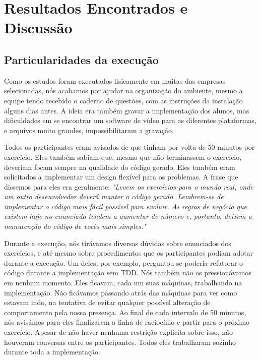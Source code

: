 \chapter{Resultados Encontrados e Discussão}
\label{cap:discussao}

\section{Particularidades da execução}

Como os estudos foram executados fisicamente em muitas das empresas selecionadas,
nós acabamos por ajudar na organização do ambiente, mesmo a equipe tendo 
recebido o caderno de questões, com as instruções da instalação
alguns dias antes. A ideia era também gravar a implementação dos alunos,
mas dificuldades em se encontrar um software de vídeo para as diferentes
plataformas, e arquivos muito grandes, impossibilitaram a gravação.

Todos os participantes eram avisados de que tinham por volta de 50 minutos
por exercício. Eles também sabiam que, mesmo que não terminassem o exercício,
deveriam focam sempre na qualidade do código gerado. Eles também eram solicitados
a implementar um design flexível para os problemas. A frase que dissemos para
eles era geralmente: \textit{"Levem os exercícios para o mundo real, onde um outro
desenvolvedor deverá manter o código gerado. Lembrem-se de implementar o código mais fácil possível
para evoluir. As regras de negócio que existem hoje no enunciado tendem a aumentar
de número e, portanto, deixem a manutenção do código de vocês mais simples."}

Durante a execução, nós tirávamos diversas dúvidas sobre enunciados dos
exercícios, e até mesmo sobre procedimentos que os participantes podiam
adotar durante a execução. Um deles, por exemplo, perguntou se poderia
refatorar o código durante a implementação sem TDD. 
Nós também não os pressionávamos em nenhum momento. Eles ficavam,
cada um suas máquinas, trabalhando na implementação. Não ficávamos 
passando atrás das máquinas para ver como estavam indo, na tentativa
de evitar qualquer possível alteração de comportamento pela nossa presença.
Ao final de cada intervalo de 50 minutos, nós avisámos para eles finalizarem
a linha de raciocínio e partir para o próximo exercício.
Apesar de não haver nenhuma restrição explícita sobre isso, não houveram
conversas entre os participantes. Todos eles trabalharam sozinho
durante toda a implementação.

